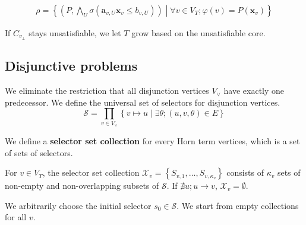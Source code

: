 \documentclass[a4paper,12pt]{article}
\begin{document}
\begin{align*}
 \rho = \left\lbrace
  \left( P, \bigwedge_U \sigma(\mathbf{a}_{v,U} \mathbf{x}_v \leq b_{v,U}) \right) \middle|
  \forall v \in V_T; \varphi(v) = P(\mathbf{x}_v)
 \right\rbrace
\end{align*}

If $C_{v_\bot}$ stays unsatisfiable, we let $T$ grow based on the
unsatisfiable core.

\subsection{Disjunctive problems}

We eliminate the restriction that all disjunction vertices $V_\vee$ have exactly one
predecessor. We define the universal set of selectors for disjunction vertices.
\[ \mathcal{S} = \prod_{v \in V_\vee} \left\lbrace v \mapsto u \middle| \exists \theta; (u,v,\theta) \in E \right\rbrace \]

We define a \textbf{selector set collection} \cite{albarghouthi13} for every Horn term vertices, which is a set of sets of selectors.

For $v \in V_T$, the selector set collection $\mathcal{X}_v = \left\lbrace S_{v,1}, \ldots, S_{v,\kappa_v} \right\rbrace$ consists of $\kappa_v$ sets of non-empty and non-overlapping subsets of $\mathcal{S}$. If $\nexists u; u \rightarrow v$, $\mathcal{X}_v = \emptyset$.

We arbitrarily choose the initial selector $s_0 \in \mathcal{S}$. We start from empty collections for all $v$.



\end{document}
